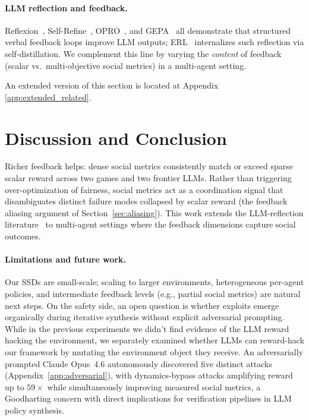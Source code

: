 \documentclass{nextgame2026} %
\begin{document}
\paragraph{LLM reflection and feedback.}
Reflexion~\citep{shinn2023reflexion},
Self-Refine~\citep{madaan2023selfrefine}, OPRO~\citep{yang2024large}, and
GEPA~\citep{gepa} all demonstrate that structured verbal feedback loops
improve LLM outputs; ERL~\citep{shi2026experiential} internalizes such
reflection via self-distillation.  We complement this line by varying the
\emph{content} of feedback (scalar vs.\ multi-objective social metrics)
in a multi-agent setting.

\noindent An extended version of this section is located at Appendix \ref{app:extended_related}.


\section{Discussion and Conclusion}
\label{sec:conclusion}

Richer feedback helps: dense social metrics consistently match or exceed
sparse scalar reward across two games and two frontier LLMs.  Rather than
triggering over-optimization of fairness, social metrics act as a
coordination signal that disambiguates distinct failure modes collapsed by
scalar reward (the feedback aliasing argument of Section~\ref{sec:aliasing}).
This work extends the LLM-reflection literature~\citep{shinn2023reflexion,
madaan2023selfrefine} to multi-agent settings where the feedback
dimensions capture social outcomes.

\paragraph{Limitations and future work.}
Our SSDs are small-scale; scaling to larger environments, heterogeneous
per-agent policies, and intermediate feedback levels (e.g., partial social
metrics) are natural next steps.  On the safety side, an open question is
whether exploits emerge organically during iterative synthesis without
explicit adversarial prompting. While in the previous experiments we didn't find evidence of the LLM reward hacking the environment, we separately examined whether LLMs can reward-hack our framework by
mutating the environment object they receive. An adversarially prompted Claude Opus~4.6 autonomously discovered five distinct attacks
(Appendix~\ref{app:adversarial}), with dynamics-bypass attacks
amplifying reward up to $59\times$ while simultaneously improving measured
social metrics, a Goodharting concern with direct implications for
verification pipelines in LLM policy synthesis.
\end{document}
